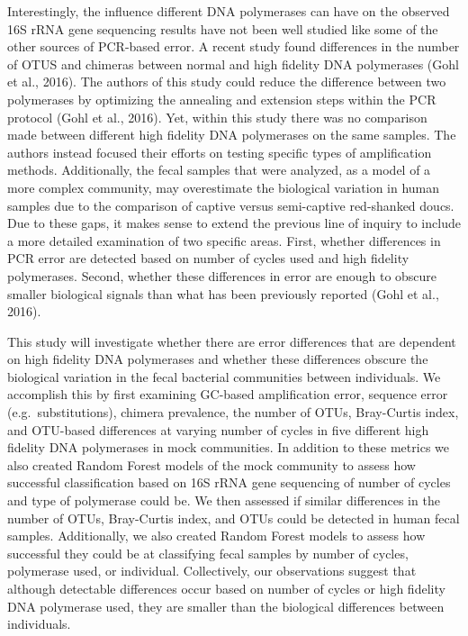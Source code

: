 \documentclass[11pt,]{article}
\begin{document}
Interestingly, the influence different DNA polymerases can have on the
observed 16S rRNA gene sequencing results have not been well studied
like some of the other sources of PCR-based error. A recent study found
differences in the number of OTUS and chimeras between normal and high
fidelity DNA polymerases (Gohl et al., 2016). The authors of this study
could reduce the difference between two polymerases by optimizing the
annealing and extension steps within the PCR protocol (Gohl et al.,
2016). Yet, within this study there was no comparison made between
different high fidelity DNA polymerases on the same samples. The authors
instead focused their efforts on testing specific types of amplification
methods. Additionally, the fecal samples that were analyzed, as a model
of a more complex community, may overestimate the biological variation
in human samples due to the comparison of captive versus semi-captive
red-shanked doucs. Due to these gaps, it makes sense to extend the
previous line of inquiry to include a more detailed examination of two
specific areas. First, whether differences in PCR error are detected
based on number of cycles used and high fidelity polymerases. Second,
whether these differences in error are enough to obscure smaller
biological signals than what has been previously reported (Gohl et al.,
2016).

This study will investigate whether there are error differences that are
dependent on high fidelity DNA polymerases and whether these differences
obscure the biological variation in the fecal bacterial communities
between individuals. We accomplish this by first examining GC-based
amplification error, sequence error (e.g.~substitutions), chimera
prevalence, the number of OTUs, Bray-Curtis index, and OTU-based
differences at varying number of cycles in five different high fidelity
DNA polymerases in mock communities. In addition to these metrics we
also created Random Forest models of the mock community to assess how
successful classification based on 16S rRNA gene sequencing of number of
cycles and type of polymerase could be. We then assessed if similar
differences in the number of OTUs, Bray-Curtis index, and OTUs could be
detected in human fecal samples. Additionally, we also created Random
Forest models to assess how successful they could be at classifying
fecal samples by number of cycles, polymerase used, or individual.
Collectively, our observations suggest that although detectable
differences occur based on number of cycles or high fidelity DNA
polymerase used, they are smaller than the biological differences
between individuals.
\end{document}

